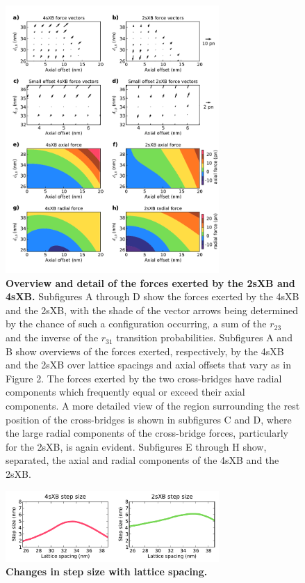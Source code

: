 \documentclass[]{article}
\begin{document}
\begin{figure}[ht]
    \begin{center}
    \includegraphics[width=3.2in]{../imgs/Figure4.pdf}
    \caption{
        \label{fig_forces}
        \textbf{Overview and detail of the forces exerted by the 2sXB and 4sXB\@.}
        Subfigures A through D show the forces exerted by the 4sXB and the 2sXB, with the shade of the vector arrows being determined by the chance of such a configuration occurring, a sum of the $r_{23}$ and the inverse of the $r_{31}$ transition probabilities. 
        Subfigures A and B show overviews of the forces exerted, respectively, by the 4sXB and the 2sXB over lattice spacings and axial offsets that vary as in Figure 2.
        The forces exerted by the two cross-bridges have radial components which frequently equal or exceed their axial components.
        A more detailed view of the region surrounding the rest position of the cross-bridges is shown in subfigures C and D, where the large radial components of the cross-bridge forces, particularly for the 2sXB, is again evident.
        Subfigures E through H show, separated, the axial and radial components of the 4sXB and the 2sXB\@.
    }
    \end{center}
\end{figure}

\begin{figure}[ht]
    \begin{center}
    \includegraphics[width=3.2in]{../imgs/FigureS1.pdf}
    \caption{
        \label{fig_step_size}
        \textbf{Changes in step size with lattice spacing.}
    }
    \end{center}
\end{figure}

\clearpage


\end{document}
